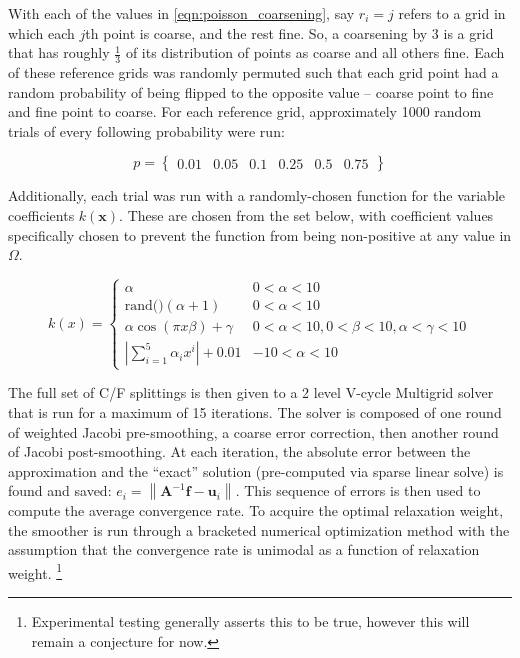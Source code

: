 \documentclass[review]{siamart190516}
\newcommand{\norm}[1]{\left\lVert#1\right\rVert}
\newcommand{\abs}[1]{\left\lvert#1\right\rvert}
\newcommand{\mat}[1]{\bm{{#1}}}
\renewcommand{\vec}[1]{\bm{{#1}}}
\begin{document}
With each of the values in \ref{eqn:poisson_coarsening}, say $r_i = j$ refers to a grid in which each $j$th point is coarse, and the rest fine.  So, a coarsening by $3$ is a grid that has roughly $\frac{1}{3}$ of its distribution of points as coarse and all others fine.  Each of these reference grids was randomly permuted such that each grid point had a random probability of being flipped to the opposite value -- coarse point to fine and fine point to coarse.  For each reference grid, approximately 1000 random trials of every following probability were run:

\begin{equation} \label{eqn:poisson_probabilities}
  p = \begin{Bmatrix} 0.01 & 0.05 & 0.1 & 0.25 & 0.5 & 0.75 \end{Bmatrix}
\end{equation}

Additionally, each trial was run with a randomly-chosen function for the variable coefficients $k\left(\vec{x}\right)$.  These are chosen from the set below, with coefficient values specifically chosen to prevent the function from being non-positive at any value in $\Omega$.

\begin{equation} \label{eqn:poisson_varcoefficients}
k\left(x\right) = \begin{cases}
\alpha & 0 < \alpha < 10 \\
\text{rand()}\left(\alpha + 1\right) & 0 < \alpha < 10 \\
\alpha\cos\left(\pi x \beta\right) + \gamma & 0 < \alpha < 10, 0 < \beta < 10, \alpha < \gamma < 10\\
\abs{\sum_{i=1}^5 \alpha_i x^i} + 0.01 & -10 < \alpha < 10
\end{cases}
\end{equation}

The full set of C/F splittings is then given to a 2 level V-cycle Multigrid solver that is run for a maximum of 15 iterations.  The solver is composed of one round of weighted Jacobi pre-smoothing, a coarse error correction, then another round of Jacobi post-smoothing.  At each iteration, the absolute error between the approximation and the ``exact'' solution (pre-computed via sparse linear solve) is found and saved: $e_i = \norm{\mat{A}^{-1}\vec{f} - \vec{u}_i}$.  This sequence of errors is then used to compute the average convergence rate.  To acquire the optimal relaxation weight, the smoother is run through a bracketed numerical optimization method with the assumption that the convergence rate is unimodal as a function of relaxation weight. \footnote{Experimental testing generally asserts this to be true, however this will remain a conjecture for now.}
\end{document}
